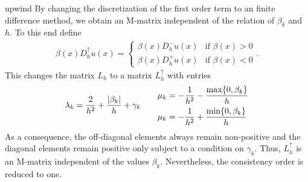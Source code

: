 \begin{Example}{upwind}
By changing the discretization of the first order term to an
 finite difference method, we obtain an M-matrix
independent of the relation of $\beta_k$ and $h$. To this end define
\begin{gather}
  \label{eq:fd:6}
  \beta(x) D^\uparrow_h u(x) =
  \begin{cases}
    \beta(x) D^-_h u(x) &\text{if } \beta(x)>0 \\
    \beta(x) D^+_h u(x) &\text{if } \beta(x)<0
  \end{cases}.
\end{gather}
This changes the matrix $L_h$ to a matrix $L_h^\uparrow$ with entries
\begin{gather}
  \label{eq:fd:7}
  \lambda_k = \frac{2}{h^2} + \frac{\lvert\beta_k\rvert}{h} + \gamma_k
  \qquad
  \begin{aligned}
    \mu_k &= -\frac1{h^2} - \frac{\max\{0,\beta_k\}}{h} \\
    \mu_k &= -\frac1{h^2} + \frac{\min\{0,\beta_k\}}{h}
  \end{aligned}
\end{gather}
As a consequence, the off-diagonal elements always remain non-positive
and the diagonal elements remain positive only subject to a condition
on $\gamma_k$. Thus, $L^\uparrow_h$ is an M-matrix independent of the
values $\beta_k$. Nevertheless, the consistency order is reduced to one.
\end{Example}
